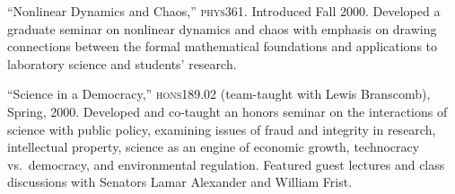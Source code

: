 \item ``Nonlinear Dynamics and Chaos,'' \textsc{phys361}. Introduced Fall 2000. Developed a graduate seminar on nonlinear dynamics and chaos with emphasis on drawing connections between the formal mathematical foundations and applications to laboratory science and students' research.
\item ``Science in a Democracy,'' \textsc{hons189.02} (team-taught with Lewis Branscomb), Spring, 2000. Developed and co-taught an honors seminar on the interactions of science with public policy, examining issues of fraud and integrity in research, intellectual property, science as an engine of economic growth, technocracy vs.\ democracy, and environmental regulation. Featured guest lectures and class discussions with Senators Lamar Alexander and William Frist.

